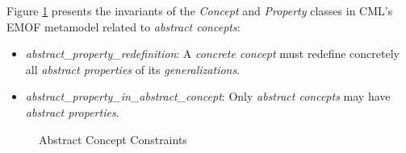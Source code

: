 Figure \ref{fig:ocl:abstract} presents the invariants
of the \emph{Concept} and \emph{Property} classes in CML's EMOF \cite{mof} metamodel
related to \emph{abstract concepts}:

\begin{itemize}

\item \emph{abstract\_property\_redefinition}:
A \emph{concrete concept} must redefine concretely all \emph{abstract properties} of 
its \emph{generalizations}.

\item \emph{abstract\_property\_in\_abstract\_concept}:
Only \emph{abstract concepts} may have \emph{abstract properties}.

\end{itemize}

\begin{figure}

\caption{Abstract Concept Constraints}
\label{fig:ocl:abstract}
\end{figure}
